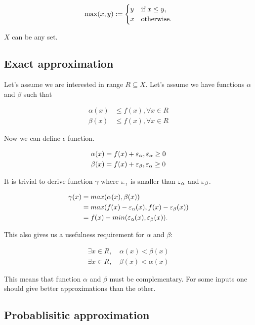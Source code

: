 \documentclass [12pt]{article} %
\begin{document}
$$
\max(x,y) := \begin{cases}
    y & \text{if $x \leq y$}, \\
    x & \text{otherwise}.
\end{cases}
$$

$X$ can be any set.

\subsection{Exact approximation}

Let's assume we are interested in range $R \subseteq X$. Let's assume we 
have functions $\alpha$ and $\beta$ such that

\begin{align*}
    \alpha(x) &\leq f(x), \forall x \in R \\
    \beta(x)  &\leq f(x), \forall x \in R 
\end{align*}

Now we can define $\epsilon$ function.

\begin{align*}
    \alpha(x) &= f(x) + \varepsilon_{\alpha}, \varepsilon_{\alpha} \geq 0 \\
    \beta(x)  &= f(x) + \varepsilon_{\beta}, \varepsilon_{\alpha} \geq 0
\end{align*}

It is trivial to derive function $\gamma$ where $\varepsilon_{\gamma}$ is smaller 
than $\varepsilon_{\alpha}$ and $\varepsilon_{\beta}$.

\begin{align*}
    \gamma(x)   &= max(\alpha(x), \beta(x)) \\
                &= max(f(x) - \varepsilon_{\alpha}(x), f(x) - \varepsilon_{\beta}(x)) \\
                &= f(x) - min(\varepsilon_{\alpha}(x), \varepsilon_{\beta}(x)).
\end{align*}

This also gives us a usefulness requirement for $\alpha$ and $\beta$:

\begin{align*}
    \exists x \in R, ~ &\alpha(x) < \beta(x) \\
    \exists x \in R, ~ &\beta(x) < \alpha(x)
\end{align*}

This means that function $\alpha$ and $\beta$ must be complementary.
For some inputs one should give better approximations than the other.

\subsection{Probablisitic approximation}
\end{document}
